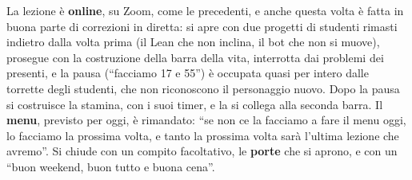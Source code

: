 La lezione è \textbf{online}, su Zoom, come le precedenti, e anche questa volta è fatta
in buona parte di correzioni in diretta: si apre con due progetti di studenti rimasti
indietro dalla volta prima (il Lean che non inclina, il bot che non si muove), prosegue
con la costruzione della barra della vita, interrotta dai problemi dei presenti, e la
pausa (``facciamo 17 e 55'') è occupata quasi per intero dalle torrette degli studenti,
che non riconoscono il personaggio nuovo. Dopo la pausa si costruisce la stamina, con i
suoi timer, e la si collega alla seconda barra. Il \textbf{menu}, previsto per oggi, è
rimandato: ``se non ce la facciamo a fare il menu oggi, lo facciamo la prossima volta, e
tanto la prossima volta sarà l'ultima lezione che avremo''. Si chiude con un compito
facoltativo, le \textbf{porte} che si aprono, e con un ``buon weekend, buon tutto e buona
cena''.

